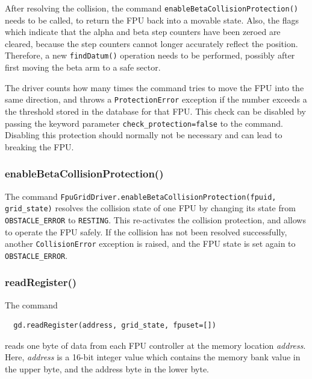 \documentclass[11pt,a4paper]{scrartcl}
\begin{document}
After resolving the collision, the command
\texttt{enableBetaCollisionProtection()} needs to be called, to return
the FPU back into a movable state.  Also, the flags which indicate
that the alpha and beta step counters have been zeroed are cleared,
because the step counters cannot longer accurately reflect the
position. Therefore, a new \texttt{findDatum()} operation needs to be
performed, possibly after first moving the beta arm to a safe sector.

The driver counts how many times the command tries to move the FPU
into the same direction, and throws a \texttt{ProtectionError}
exception if the number exceeds a the threshold stored in the database
for that FPU. This check can be disabled by passing the keyword
parameter \texttt{check\_protection=false} to the command. Disabling
this protection should normally not be necessary and can lead to
breaking the FPU.


\subsubsection{enableBetaCollisionProtection()}

The command \texttt{FpuGridDriver.enableBetaCollisionProtection(fpuid,
  grid\_state)} resolves the collision state of one FPU by changing
its state from \texttt{OBSTACLE\_ERROR} to \texttt{RESTING}.  This
re-activates the collision protection, and allows to operate the FPU
safely. If the collision has not been resolved successfully, another
\texttt{CollisionError} exception is raised, and the FPU state is set
again to \texttt{OBSTACLE\_ERROR}.

\subsubsection{readRegister()}
\label{sec:readregister}

The command

\begin{verbatim}
  gd.readRegister(address, grid_state, fpuset=[])
\end{verbatim}
reads one byte of data from each FPU controller
at the memory location \emph{address}. Here,
\emph{address} is a 16-bit integer value
which contains the memory bank value in the
upper byte, and the address byte in the lower byte.
\end{document}
